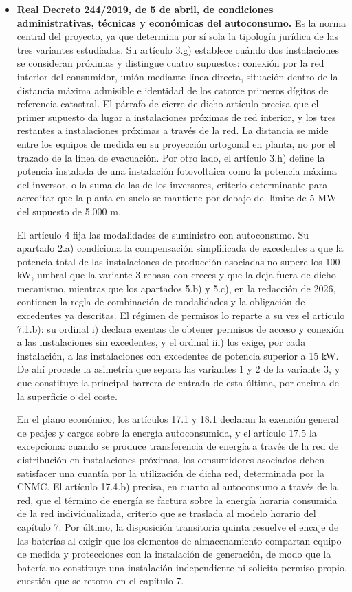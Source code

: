 \begin{itemize}
    \item \textbf{Real Decreto 244/2019, de 5 de abril, de condiciones administrativas, técnicas y económicas del autoconsumo.} Es la norma central del proyecto, ya que determina por sí sola la tipología jurídica de las tres variantes estudiadas. Su artículo 3.g) establece cuándo dos instalaciones se consideran próximas y distingue cuatro supuestos: conexión por la red interior del consumidor, unión mediante línea directa, situación dentro de la distancia máxima admisible e identidad de los catorce primeros dígitos de referencia catastral. El párrafo de cierre de dicho artículo precisa que el primer supuesto da lugar a instalaciones próximas de red interior, y los tres restantes a instalaciones próximas a través de la red. La distancia se mide entre los equipos de medida en su proyección ortogonal en planta, no por el trazado de la línea de evacuación. Por otro lado, el artículo 3.h) define la potencia instalada de una instalación fotovoltaica como la potencia máxima del inversor, o la suma de las de los inversores, criterio determinante para acreditar que la planta en suelo se mantiene por debajo del límite de 5 MW del supuesto de 5.000 m.

    El artículo 4 fija las modalidades de suministro con autoconsumo. Su apartado 2.a) condiciona la compensación simplificada de excedentes a que la potencia total de las instalaciones de producción asociadas no supere los 100 kW, umbral que la variante 3 rebasa con creces y que la deja fuera de dicho mecanismo, mientras que los apartados 5.b) y 5.c), en la redacción de 2026, contienen la regla de combinación de modalidades y la obligación de excedentes ya descritas. El régimen de permisos lo reparte a su vez el artículo 7.1.b): su ordinal i) declara exentas de obtener permisos de acceso y conexión a las instalaciones sin excedentes, y el ordinal iii) los exige, por cada instalación, a las instalaciones con excedentes de potencia superior a 15 kW. De ahí procede la asimetría que separa las variantes 1 y 2 de la variante 3, y que constituye la principal barrera de entrada de esta última, por encima de la superficie o del coste.

    En el plano económico, los artículos 17.1 y 18.1 declaran la exención general de peajes y cargos sobre la energía autoconsumida, y el artículo 17.5 la excepciona: cuando se produce transferencia de energía a través de la red de distribución en instalaciones próximas, los consumidores asociados deben satisfacer una cuantía por la utilización de dicha red, determinada por la \ac{CNMC}. El artículo 17.4.b) precisa, en cuanto al autoconsumo a través de la red, que el término de energía se factura sobre la energía horaria consumida de la red individualizada, criterio que se traslada al modelo horario del capítulo 7. Por último, la disposición transitoria quinta resuelve el encaje de las baterías al exigir que los elementos de almacenamiento compartan equipo de medida y protecciones con la instalación de generación, de modo que la batería no constituye una instalación independiente ni solicita permiso propio, cuestión que se retoma en el capítulo 7.


\end{itemize}

